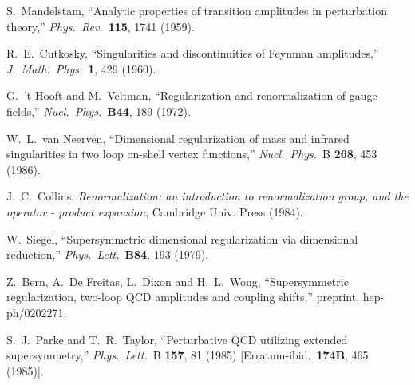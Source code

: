 \documentclass[12pt]{livrev}
\begin{document}
\begin{thebibliography}{99}
S.~Mandelstam,
``Analytic properties of transition amplitudes in perturbation theory,''
{\it Phys.\ Rev.}\  {\bf 115}, 1741 (1959).

R.~E.~Cutkosky,
``Singularities and discontinuities of Feynman amplitudes,''
{\it J.\ Math.\ Phys.}\  {\bf 1}, 429 (1960).

G.~'t Hooft and M.~Veltman,
``Regularization and renormalization of gauge fields,''
{\it Nucl.\ Phys.}\ {\bf B44}, 189 (1972).

W.~L.~van Neerven,
``Dimensional regularization of mass and infrared singularities 
in two loop on-shell vertex functions,''
{\it Nucl.\ Phys.}\ B {\bf 268}, 453 (1986).

J.~C.~Collins, {\it Renormalization: an introduction to renormalization group,
   and the operator - product expansion},  Cambridge
   Univ. Press (1984).

W.~Siegel,
``Supersymmetric dimensional regularization via dimensional reduction,''
{\it Phys.\ Lett.}\  {\bf B84}, 193 (1979).

Z.~Bern, A.~De Freitas, L.~Dixon and H.~L.~Wong,
``Supersymmetric regularization, two-loop QCD amplitudes and 
coupling  shifts,''
preprint, hep-ph/0202271.

S.~J.~Parke and T.~R.~Taylor,
``Perturbative QCD utilizing extended supersymmetry,''
{\it Phys.\ Lett.}\ B {\bf 157}, 81 (1985)
[Erratum-ibid.\  {\bf 174B}, 465 (1985)].


\end{thebibliography}
\end{document}
